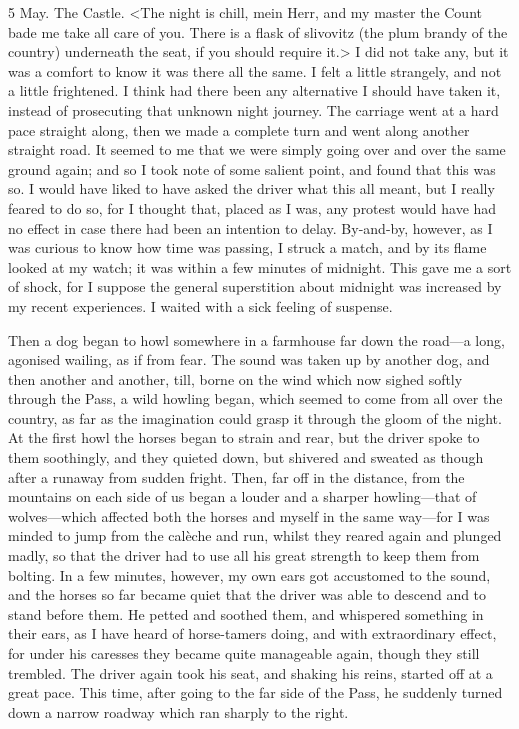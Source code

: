 \begin{diary}{5 May. The Castle.}
<The night is chill, mein Herr, and my master the Count bade me take all care of you. There is a flask of slivovitz (the plum brandy of the country) underneath the seat, if you should require it.> I did not take any, but it was a comfort to know it was there all the same. I felt a little strangely, and not a little frightened. I think had there been any alternative I should have taken it, instead of prosecuting that unknown night journey. The carriage went at a hard pace straight along, then we made a complete turn and went along another straight road. It seemed to me that we were simply going over and over the same ground again; and so I took note of some salient point, and found that this was so. I would have liked to have asked the driver what this all meant, but I really feared to do so, for I thought that, placed as I was, any protest would have had no effect in case there had been an intention to delay. By-and-by, however, as I was curious to know how time was passing, I struck a match, and by its flame looked at my watch; it was within a few minutes of midnight. This gave me a sort of shock, for I suppose the general superstition about midnight was increased by my recent experiences. I waited with a sick feeling of suspense.

Then a dog began to howl somewhere in a farmhouse far down the road—a long, agonised wailing, as if from fear. The sound was taken up by another dog, and then another and another, till, borne on the wind which now sighed softly through the Pass, a wild howling began, which seemed to come from all over the country, as far as the imagination could grasp it through the gloom of the night. At the first howl the horses began to strain and rear, but the driver spoke to them soothingly, and they quieted down, but shivered and sweated as though after a runaway from sudden fright. Then, far off in the distance, from the mountains on each side of us began a louder and a sharper howling—that of wolves—which affected both the horses and myself in the same way—for I was minded to jump from the calèche and run, whilst they reared again and plunged madly, so that the driver had to use all his great strength to keep them from bolting. In a few minutes, however, my own ears got accustomed to the sound, and the horses so far became quiet that the driver was able to descend and to stand before them. He petted and soothed them, and whispered something in their ears, as I have heard of horse-tamers doing, and with extraordinary effect, for under his caresses they became quite manageable again, though they still trembled. The driver again took his seat, and shaking his reins, started off at a great pace. This time, after going to the far side of the Pass, he suddenly turned down a narrow roadway which ran sharply to the right.


\end{diary}
